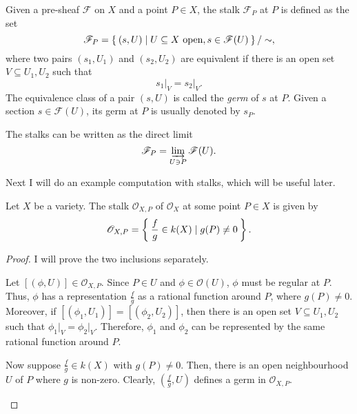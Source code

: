 \begin{defin}
  Given a pre-sheaf $\mathscr{F}$ on $X$ and a point $P\in X$, the stalk
  $\mathscr{F}_{P}$ at $P$ is defined as the set
  \[
    \mathscr{F}_{P}=\Set{(s, U)\mid U\subseteq X\text{ open}, s\in
    \mathscr{F}(U)}/\sim,
  \]
  where two pairs $(s_{1}, U_{1})$ and $(s_{2}, U_{2})$ are equivalent
  if there is an open set $V\subseteq U_{1}, U_{2}$ such that
  \[
    s_{1}\vert_{V}=s_{2}\vert_{V}.
  \]
  The equivalence class of a pair $(s, U)$ is called the \emph{germ}
  of $s$ at $P$. Given a section $s\in\mathscr{F}(U)$, its germ at $P$
  is usually denoted by $s_{P}$.
\end{defin}
\begin{cat}
  The stalks can be written as the direct limit
  \[\mathscr{F}_{P}=\varinjlim_{U\ni P}\mathscr{F}(U).\]
\end{cat}
Next I will do an example computation with stalks, which will be useful
later.
\begin{prop}\label{prop:struct_stalk}
  Let $X$ be a variety. The stalk $\mathscr{O}_{X,P}$ of
  $\mathscr{O}_{X}$ at some point $P\in X$ is given by
  \[
    \mathscr{O}_{X,P}=\Set{\frac{f}g\in k(X)\mid g(P)\neq 0}.
  \]
\end{prop}
\begin{proof}
  I will prove the two inclusions separately.
  \begin{description}[style=nextline]
    \item[$\subseteq\big)$]
          Let $[(\phi, U)]\in \mathscr{O}_{X,P}$. Since $P\in U$ and
          $\phi\in \mathscr{O}(U)$, $\phi$ must be regular at $P$. Thus,
          $\phi$ has a representation $\frac{f}g$ as a rational function
          around $P$, where $g(P)\neq 0$. Moreover, if $[(\phi_{1}, U_{1})]
          =[(\phi_{2}, U_{2})]$, then there is an open set $V\subseteq
          U_{1},U_{2}$ such that $\phi_{1}\vert_{V}=\phi_{2}\vert_{V}$.
          Therefore, $\phi_{1}$ and $\phi_{2}$ can be represented by the
          same rational function around $P$.
    \item[$\supseteq\big)$]
          Now suppose $\frac{f}g\in k(X)$ with $g(P)\neq 0$. Then, there
          is an open neighbourhood $U$ of $P$ where $g$ is non-zero.
          Clearly, $(\frac{f}g, U)$ defines a germ in $\mathscr{O}_{X,P}$.
  \end{description}
\end{proof}

